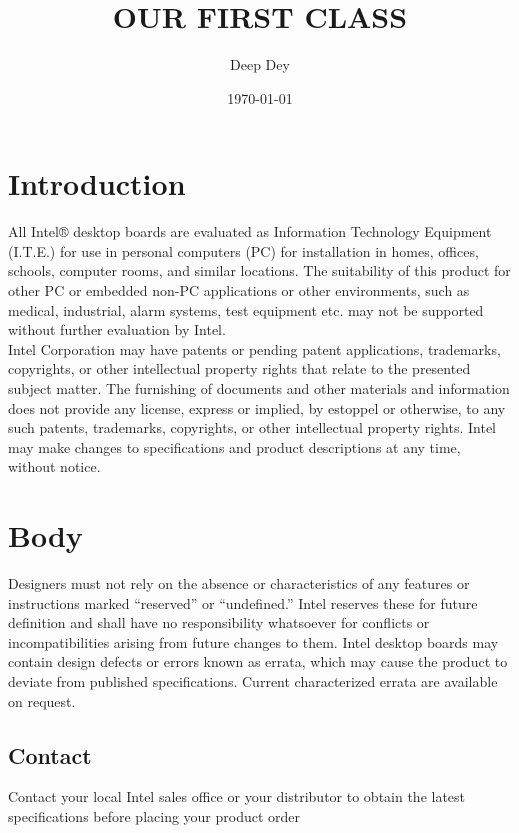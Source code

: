 \documentclass[12pt]{article}
\title{OUR FIRST CLASS}
\author{Deep Dey}
\date{\today}
\begin{document}
    
    \maketitle
    \hrulefill
    \vspace{1cm}
    \tableofcontents
    \pagebreak
    
    \section{Introduction}
    All Intel® desktop boards are evaluated as Information Technology Equipment (I.T.E.) for use in personal computers (PC) for installation in homes, offices, schools, computer rooms, and similar locations. The suitability of this product for other PC or embedded non-PC applications or other environments, such as medical, industrial, alarm systems, test equipment etc. may not be supported without further evaluation by Intel.\\
Intel Corporation may have patents or pending patent applications, trademarks, copyrights, or other intellectual property rights that relate to the presented subject matter. The furnishing of documents and other materials and information does not provide any license, express or implied, by estoppel or otherwise, to any such patents, trademarks, copyrights, or other intellectual property rights.
Intel may make changes to specifications and product descriptions at any time, without notice.\\
\section{Body}
 Designers must not rely on the absence or characteristics of any features or instructions marked “reserved”
or “undefined.” Intel reserves these for future definition and shall have no responsibility whatsoever for
conflicts or incompatibilities arising from future changes to them.
Intel desktop boards may contain design defects or errors known as errata, which may cause the product to
deviate from published specifications. Current characterized errata are available on request.
\subsection{Contact}
Contact your local Intel sales office or your distributor to obtain the latest specifications before placing your
product order

    
\end{document}
